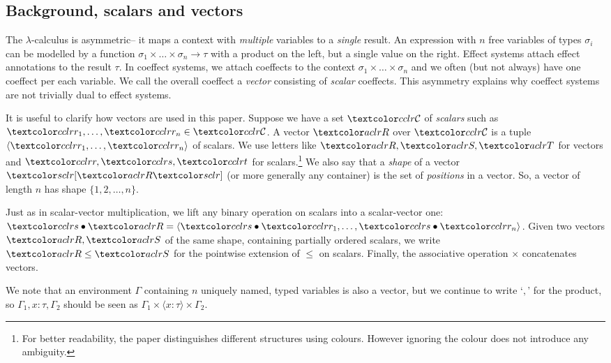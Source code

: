 \subsection{Background, scalars and vectors}

The $\lambda$-calculus is asymmetric-- it maps a context with \emph{multiple} variables to a 
\emph{single} result. An expression with $n$ free variables of types $\sigma_i$ can be modelled
by a function
$\sigma_1 \times \ldots \times \sigma_n \rightarrow \tau$ with a product on the left, but a single value
on the right. Effect systems attach effect annotations to the result $\tau$. In coeffect systems,
we attach coeffects to the context $\sigma_1 \times \ldots \times \sigma_n$ and we often (but not always)
have one coeffect per each variable. We call the overall coeffect a \emph{vector} consisting of
\emph{scalar} coeffects. This asymmetry explains why coeffect systems are not trivially dual to 
effect systems.

It is useful to clarify how vectors are used in this paper. Suppose we have a set $\C$ of
\emph{scalars} such as $\cclrd{r_1},\ldots,\cclrd{r_n} \in \C$. A vector $\aclrd{R}$ over $\C$
is a tuple $\langle \cclrd{r_1}, \ldots, \cclrd{r_n}\rangle$ of scalars. 
We use letters like $\aclrd{R}, \aclrd{S}, \aclrd{T}$ for 
vectors and $\cclrd{r},\cclrd{s},\cclrd{t}$ for scalars.\footnote{For better readability, the paper 
distinguishes different structures using colours. However ignoring the colour does not introduce 
any ambiguity.} We also say that a \emph{shape} of a vector $\mksh{\aclrd{R}}$ (or more generally any container) 
is the set of \emph{positions} in a vector. So, a vector of length
$n$ has shape $\{ 1, 2, \ldots, n \}$. 

Just as in scalar-vector multiplication, we lift any binary operation on scalars into a scalar-vector one:
$\cclrd{s} \bullet \aclrd{R} = \langle \cclrd{s}\bullet\cclrd{r_1}, \ldots, \cclrd{s}\bullet\cclrd{r_n}\rangle$.
Given two vectors $\aclrd{R},\aclrd{S}$ of the same shape, containing partially ordered scalars, we 
write $\aclrd{R} \leq \aclrd{S}$ for the pointwise extension of $\leq$ on scalars. Finally,
the associative operation $\times$ concatenates vectors.

We note that an environment $\Gamma$ containing $n$ uniquely named, typed variables is also a vector, 
but we continue to write `$,$' for the product, so $\Gamma_1, x\!:\!\tau, \Gamma_2$ should 
be seen as $\Gamma_1 \times \langle x\!:\!\tau\rangle \times \Gamma_2$.


